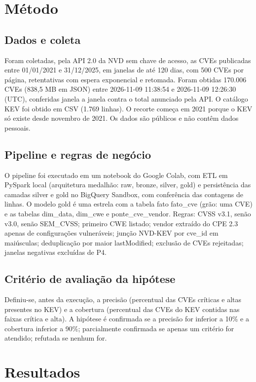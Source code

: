 \documentclass[11pt,a4paper]{article}
\begin{document}
\section{Método}
\subsection{Dados e coleta}
Foram coletadas, pela API 2.0 da NVD \cite{nvd} sem chave de acesso, as CVEs publicadas entre 01/01/2021 e 31/12/2025, em janelas de até 120 dias, com 500 CVEs por página, retentativas com espera exponencial e retomada. Foram obtidas 170.006 CVEs (838,5 MB em JSON) entre 2026-11-09 11:38:54 e 2026-11-09 12:26:30 (UTC), conferidas janela a janela contra o total anunciado pela API. O catálogo KEV \cite{kev} foi obtido em CSV (1.769 linhas). O recorte começa em 2021 porque o KEV só existe desde novembro de 2021. Os dados são públicos e não contêm dados pessoais.

\subsection{Pipeline e regras de negócio}
O pipeline foi executado em um notebook do Google Colab, com ETL em PySpark local (arquitetura medalhão: raw, bronze, silver, gold) e persistência das camadas silver e gold no BigQuery Sandbox, com conferência das contagens de linhas. O modelo gold é uma estrela com a tabela fato fato\_cve (grão: uma CVE) e as tabelas dim\_data, dim\_cwe e ponte\_cve\_vendor. Regras: CVSS v3.1, senão v3.0, senão SEM\_CVSS; primeiro CWE listado; vendor extraído do CPE 2.3 apenas de configurações vulneráveis; junção NVD-KEV por cve\_id em maiúsculas; deduplicação por maior lastModified; exclusão de CVEs rejeitadas; janelas negativas excluídas de P4.

\subsection{Critério de avaliação da hipótese}
Definiu-se, antes da execução, a precisão (percentual das CVEs críticas e altas presentes no KEV) e a cobertura (percentual das CVEs do KEV contidas nas faixas crítica e alta). A hipótese é confirmada se a precisão for inferior a 10\% e a cobertura inferior a 90\%; parcialmente confirmada se apenas um critério for atendido; refutada se nenhum for.

\section{Resultados}
\end{document}
